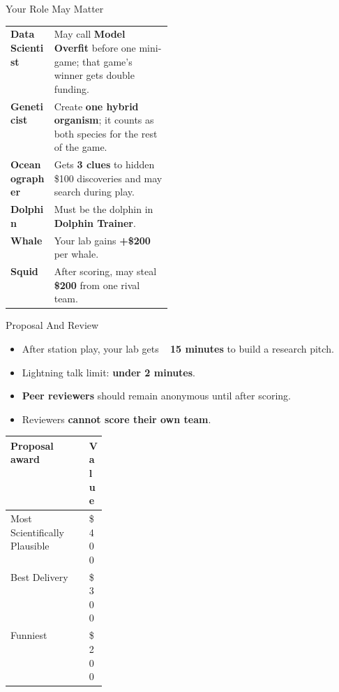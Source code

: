 \documentclass[12pt]{extarticle}
\begin{document}
\begin{minipage}[t]{0.492\textwidth}
\begin{labbox}{Your Role May Matter}
\scriptsize
\begin{tabularx}{\linewidth}{@{}>{\bfseries}p{0.27\linewidth}Y@{}}
Data Scientist & May call \textbf{Model Overfit} before one mini-game; that game's winner gets double funding. \\
Geneticist & Create \textbf{one hybrid organism}; it counts as both species for the rest of the game. \\
Oceanographer & Gets \textbf{3 clues} to hidden \$100 discoveries and may search during play. \\
Dolphin & Must be the dolphin in \textbf{Dolphin Trainer}. \\
Whale & Your lab gains \textbf{+\$200} per whale. \\
Squid & After scoring, may steal \textbf{\$200} from one rival team. \\
\end{tabularx}
\end{labbox}

\begin{labbox}{Proposal And Review}
\begin{itemize}
\item After station play, your lab gets ~ \textbf{15 minutes} to build a research pitch.
\item Lightning talk limit: \textbf{under 2 minutes}.
\item \textbf{Peer reviewers} should remain anonymous until after scoring.
\item Reviewers \textbf{cannot score their own team}.
\end{itemize}

\vspace{2pt}
\begin{tabularx}{\linewidth}{@{}Y >{\raggedleft\arraybackslash}p{0.16\linewidth}@{}}
\toprule
Proposal award & Value \\
\midrule
Most Scientifically Plausible & \$400 \\
Best Delivery & \$300 \\
Funniest & \$200 \\
\bottomrule
\end{tabularx}
\end{labbox}
\end{minipage}\hfill
\end{document}
